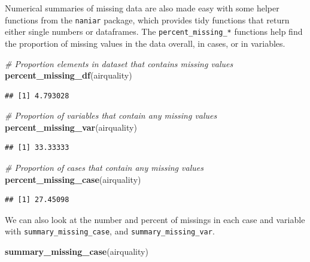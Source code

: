 \documentclass[]{article}
\newenvironment{Shaded}{\begin{snugshade}}{\end{snugshade}}
\newcommand{\KeywordTok}[1]{\textcolor[rgb]{0.13,0.29,0.53}{\textbf{{#1}}}}
\newcommand{\CommentTok}[1]{\textcolor[rgb]{0.56,0.35,0.01}{\textit{{#1}}}}
\newcommand{\NormalTok}[1]{{#1}}
\begin{document}
Numerical summaries of missing data are also made easy with some helper
functions from the \texttt{naniar} package, which provides tidy
functions that return either single numbers or dataframes. The
\texttt{percent\_missing\_*} functions help find the proportion of
missing values in the data overall, in cases, or in variables.

\begin{Shaded}
\begin{Highlighting}[]
\CommentTok{# Proportion elements in dataset that contains missing values}
\KeywordTok{percent_missing_df}\NormalTok{(airquality)}
\end{Highlighting}
\end{Shaded}

\begin{verbatim}
## [1] 4.793028
\end{verbatim}

\begin{Shaded}
\begin{Highlighting}[]
\CommentTok{# Proportion of variables that contain any missing values}
\KeywordTok{percent_missing_var}\NormalTok{(airquality)}
\end{Highlighting}
\end{Shaded}

\begin{verbatim}
## [1] 33.33333
\end{verbatim}

\begin{Shaded}
\begin{Highlighting}[]
 \CommentTok{# Proportion of cases that contain any missing values}
\KeywordTok{percent_missing_case}\NormalTok{(airquality)}
\end{Highlighting}
\end{Shaded}

\begin{verbatim}
## [1] 27.45098
\end{verbatim}

We can also look at the number and percent of missings in each case and
variable with \texttt{summary\_missing\_case}, and
\texttt{summary\_missing\_var}.

\begin{Shaded}
\begin{Highlighting}[]
\KeywordTok{summary_missing_case}\NormalTok{(airquality)}
\end{Highlighting}
\end{Shaded}
\end{document}
